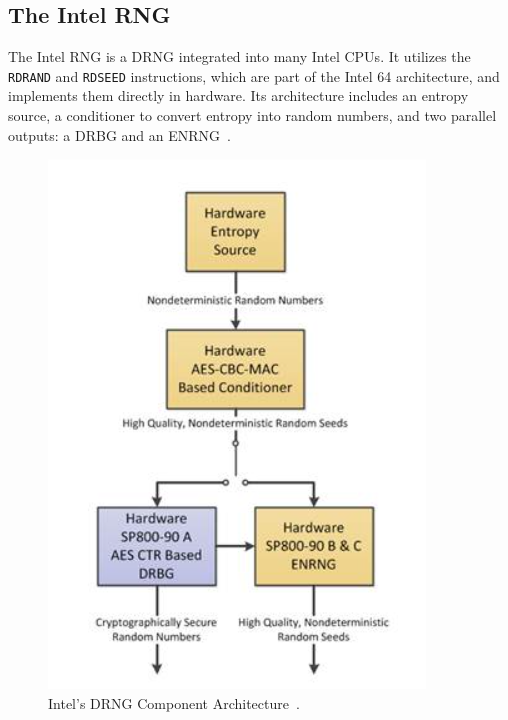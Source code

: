 \subsection{The Intel RNG}

The Intel RNG is a DRNG integrated into many Intel CPUs. It utilizes the \texttt{RDRAND} and \texttt{RDSEED} instructions, which are part of the Intel 64 architecture, and implements them directly in hardware. Its architecture includes an entropy source, a conditioner to convert entropy into random numbers, and two parallel outputs: a DRBG and an ENRNG~\cite{mechalas2018}.

\begin{figure}[h]
    \centering
    \includegraphics[width=\columnwidth]{images/IntelDRNPipeline.PNG}
    \caption{Intel’s DRNG Component Architecture~\cite{mechalas2018}.}
    \label{fig:intel-drng-architecture}
\end{figure}

